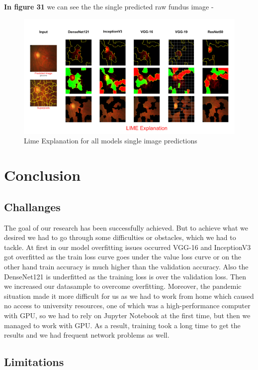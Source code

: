 \documentclass[conference]{IEEEtran}
\begin{document}
 \noindent \textbf{In figure 31} we can see the the single predicted raw fundus image -

\begin{figure}[hbt!]
\centering
\includegraphics[scale=0.12]{fig-52.png}
\caption{Lime Explanation for all models single image predictions}
\label{fig:x Lime Explanation for all models single image predictions}
\end{figure}

\newpage
\section{Conclusion}
\subsection{Challanges}

The goal of our research has been successfully achieved. But to achieve what we desired we had to go through some difficulties or obstacles, which we had to tackle. At first in our model overfitting issues occurred VGG-16 and InceptionV3 got overfitted as the train loss curve goes under the value loss curve or on the other hand train accuracy is much higher than the validation accuracy. Also the DenseNet121 is underfitted as the training loss is over the validation loss. Then we increased our datasample to overcome overfitting. Moreover, the pandemic situation made it more difficult for us as we had to work from home which caused no access to university resources,  one of which was a high-performance computer with GPU, so we had to rely on Jupyter Notebook at the first time, but then we managed to work with GPU. As a result, training took a long time to get the results and we had frequent network problems as well. 

\subsection{Limitations}
\end{document}
